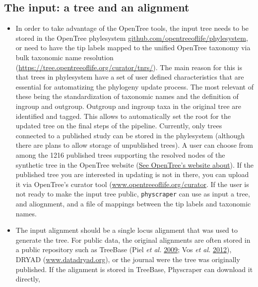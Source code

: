 \documentclass[]{article}
\providecommand{\tightlist}{%
  \setlength{\itemsep}{0pt}\setlength{\parskip}{0pt}}
\begin{document}
\hypertarget{the-input-a-tree-and-an-alignment}{%
\subsection{The input: a tree and an alignment}\label{the-input-a-tree-and-an-alignment}}

\begin{itemize}
\tightlist
\item
  In order to take advantage of the OpenTree tools, the input tree needs to be stored in the
  OpenTree phylesystem \href{https://github.com/opentreeoflife/phylesystem}{github.com/opentreeoflife/phylesystem}, or need to have the tip labels mapped to the unified OpenTree taxonomy via bulk taxonomic name resolution (\url{https://tree.opentreeoflife.org/curator/tnrs/}).
  The main
  reason for this is that trees in phylesystem have a set of user defined characteristics
  that are essential for automatizing the phylogeny update process. The most relevant of these being the standardization of taxonomic names and the definition of ingroup and outgroup. Outgroup and ingroup taxa in the original tree are identified and tagged. This allows to automatically set the root for the updated tree on the final steps of the pipeline.
  Currently, only trees connected to
  a published study can be stored in the phylesystem (although there are plans to
  allow storage of unpublished trees).
  A user can choose from among the 1216 published trees supporting the resolved nodes of the synthetic tree in the OpenTree website (\href{https://tree.opentreeoflife.org/about/synthesis-release/v12.3}{See OpenTree's website about}). If the published tree you are interested in updating is not in there, you can upload it via OpenTree's curator tool (\href{https://tree.opentreeoflife.org/curator}{www.opentreeoflife.org/curator}.
  If the user is not ready to make the input tree public, \texttt{physcraper} can use as input a tree, and aliognment, and a file of mappings between the tip labels and taxonomic names.
\item
  The input alignment should be a single locus alignment that was used to generate the tree. For public data, the original
  alignments are often stored in a public repository such as TreeBase (Piel \emph{et al.} \protect\hyperlink{ref-piel2009treebase}{2009}; Vos \emph{et al.} \protect\hyperlink{ref-vos2012nexml}{2012}),
  DRYAD (\href{http://datadryad.org/}{www.datadryad.org}), or the journal were the tree was originally published.
  If the alignment is stored in TreeBase, Physcraper can download it directly,

\end{itemize}
\end{document}
